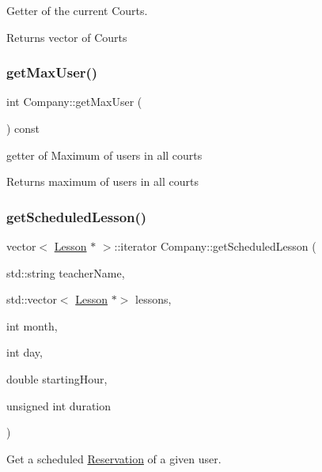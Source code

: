 Getter of the current Courts. 

\begin{DoxyReturn}{Returns}
vector of Courts 
\end{DoxyReturn}
\mbox{\label{class_company_a837fd39a8f03c20a3ceb8617410956b7}} 
\subsubsection{\texorpdfstring{get\+Max\+User()}{getMaxUser()}}
{\footnotesize\ttfamily int Company\+::get\+Max\+User (\begin{DoxyParamCaption}{ }\end{DoxyParamCaption}) const}



getter of Maximum of users in all courts 

\begin{DoxyReturn}{Returns}
maximum of users in all courts 
\end{DoxyReturn}
\mbox{\label{class_company_a1a29eaacb474c8a76528ddfd74b9032a}} 
\subsubsection{\texorpdfstring{get\+Scheduled\+Lesson()}{getScheduledLesson()}}
{\footnotesize\ttfamily vector$<$ \mbox{\hyperlink{class_lesson}{Lesson}} $\ast$ $>$\+::iterator Company\+::get\+Scheduled\+Lesson (\begin{DoxyParamCaption}\item[{std\+::string}]{teacher\+Name,  }\item[{std\+::vector$<$ \mbox{\hyperlink{class_lesson}{Lesson}} $\ast$$>$}]{lessons,  }\item[{int}]{month,  }\item[{int}]{day,  }\item[{double}]{starting\+Hour,  }\item[{unsigned int}]{duration }\end{DoxyParamCaption})}



Get a scheduled \mbox{\hyperlink{class_reservation}{Reservation}} of a given user. 


